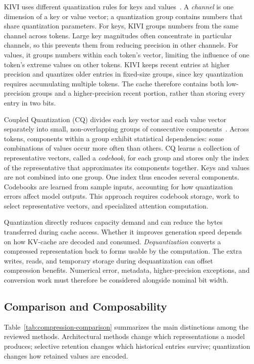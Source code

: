 KIVI uses different quantization rules for keys and values~\cite{kv_liu2024kivi}. A \emph{channel} is one dimension of a key or value vector; a quantization group contains numbers that share quantization parameters. For keys, KIVI groups numbers from the same channel across tokens. Large key magnitudes often concentrate in particular channels, so this prevents them from reducing precision in other channels. For values, it groups numbers within each token's vector, limiting the influence of one token's extreme values on other tokens. KIVI keeps recent entries at higher precision and quantizes older entries in fixed-size groups, since key quantization requires accumulating multiple tokens. The cache therefore contains both low-precision groups and a higher-precision recent portion, rather than storing every entry in two bits.

Coupled Quantization (CQ) divides each key vector and each value vector separately into small, non-overlapping groups of consecutive components~\cite{kv_zhang2024cq}. Across tokens, components within a group exhibit statistical dependencies: some combinations of values occur more often than others. CQ learns a collection of representative vectors, called a \emph{codebook}, for each group and stores only the index of the representative that approximates its components together. Keys and values are not combined into one group. One index thus encodes several components. Codebooks are learned from sample inputs, accounting for how quantization errors affect model outputs. This approach requires codebook storage, work to select representative vectors, and specialized attention computation.

Quantization directly reduces capacity demand and can reduce the bytes transferred during cache access. Whether it improves generation speed depends on how KV-cache are decoded and consumed. \emph{Dequantization} converts a compressed representation back to forms usable by the computation. The extra writes, reads, and temporary storage during dequantization can offset compression benefits.  Numerical error, metadata, higher-precision exceptions, and conversion work must therefore be considered alongside nominal bit width.

\subsection{Comparison and Composability}\label{sec:techniques:compression-summary}

Table~\ref{tab:compression-comparison} summarizes the main distinctions among the reviewed methods. Architectural methods change which representations a model produces; selective retention changes which historical entries survive; quantization changes how retained values are encoded.

